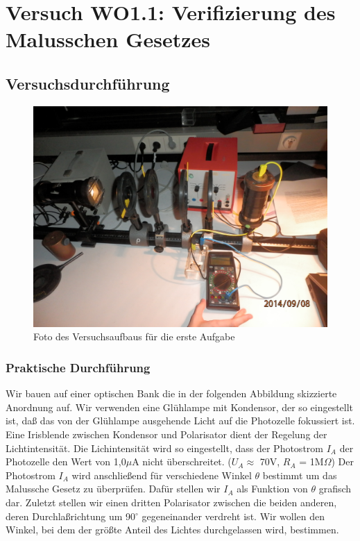 \documentclass[12pt]{scrartcl}
\begin{document}
\section{Versuch WO1.1: Verifizierung des Malusschen Gesetzes}
\subsection{Versuchsdurchführung}

\begin{figure}[H]
\centering
    \includegraphics[scale = 0.1]{aufgabe_1.JPG}
  	\caption[Foto des Versuchsaufbaus für die erste Aufgabe]{Foto des Versuchsaufbaus für die erste Aufgabe}
  \label{fig:aufgabe_1}
\end{figure}

\subsubsection{Praktische Durchführung}
Wir bauen auf einer optischen Bank die in 
der folgenden Abbildung skizzierte Anordnung auf.
Wir verwenden eine Glühlampe mit Kondensor, der so eingestellt ist, daß das von der Glühlampe ausgehende Licht auf die Photozelle fokussiert ist. Eine Irisblende zwischen Kondensor und Polarisator dient der Regelung der Lichtintensität. Die
Lichintensität wird so eingestellt, dass der Photostrom $I_A$ der Photozelle 
den Wert von 1,0$\mu$A nicht überschreitet. ($U_A \approx$ 70V, $R_A$ = 1M$\Omega$) Der Photostrom $I_A$ wird anschließend für verschiedene Winkel $\theta$ bestimmt um das Malussche Gesetz zu überprüfen.
Dafür stellen wir $I_A$ als Funktion von $\theta$ grafisch dar.
Zuletzt stellen wir einen dritten Polarisator zwischen die beiden anderen, deren Durchlaßrichtung
um 90$^\circ$ gegeneinander verdreht ist. Wir wollen den Winkel, bei dem der größte Anteil des Lichtes durchgelassen wird, bestimmen.
\end{document}
